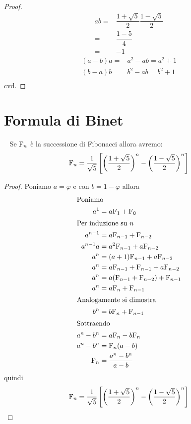 \begin{proof}
	\begin{align*}
		ab={}&\dfrac{1+\sqrt{5}}{2}\dfrac{1-\sqrt{5}}{2}\\
		={}&\dfrac{1-5}{4}\\
		={}&-1
	\end{align*}
	\begin{align*}
		(a-b)a={}&a^2-ab=a^2+1\\
		(b-a)b={}&b^2-ab=b^2+1\\
	\end{align*}
	cvd.
\end{proof}
\section{Formula di Binet}
\begin{thm}~\cite{Conti2020}
	Se $\mathrm{F}_{n}$ è la successione di Fibonacci allora avremo:
	\begin{equation}
		\mathrm{F}_{n}=\dfrac{1}{\sqrt{5}}\left[\left(\dfrac{1+\sqrt{5}}{2}\right)^n-\left(\dfrac{1-\sqrt{5}}{2}\right)^n\right]
	\end{equation}\label{eqn:FinBinet}
\end{thm}
\begin{proof}
	Poniamo $a=\varphi$ e con $b=1-\varphi$ allora
	\begin{align*}
		\intertext{Poniamo}
		a^1={}&a\mathrm{F}_{1}+\mathrm{F}_{0}\\
		\intertext{Per induzione su $n$}
		a^{n-1}={}&a\mathrm{F}_{n-1}+\mathrm{F}_{n-2}\\
		a^{n-1}a={}&a^2\mathrm{F}_{n-1}+a\mathrm{F}_{n-2}\\
		a^{n}={}&(a+1)\mathrm{F}_{n-1}+a\mathrm{F}_{n-2}\\
		a^{n}={}&a\mathrm{F}_{n-1}+\mathrm{F}_{n-1}+a\mathrm{F}_{n-2}\\
		a^{n}={}&a(\mathrm{F}_{n-1}+\mathrm{F}_{n-2})+\mathrm{F}_{n-1}\\
		a^{n}={}&a\mathrm{F}_{n}+\mathrm{F}_{n-1}\\
		\intertext{Analogamente si dimostra}
		b^{n}={}&b\mathrm{F}_{n}+\mathrm{F}_{n-1}\\
		\intertext{Sottraendo}
		a^n-b^n={}&a\mathrm{F}_{n}-b\mathrm{F}_{n}\\
		a^n-b^n={}&\mathrm{F}_{n}(a-b)\\
		\mathrm{F}_{n}={}&\dfrac{a^n-b^n}{a-b}
	\end{align*}
quindi
\begin{equation}
\mathrm{F}_{n}=\dfrac{1}{\sqrt{5}}\left[\left(\dfrac{1+\sqrt{5}}{2}\right)^n-\left(\dfrac{1-\sqrt{5}}{2}\right)^n\right]
\end{equation}
\end{proof}
